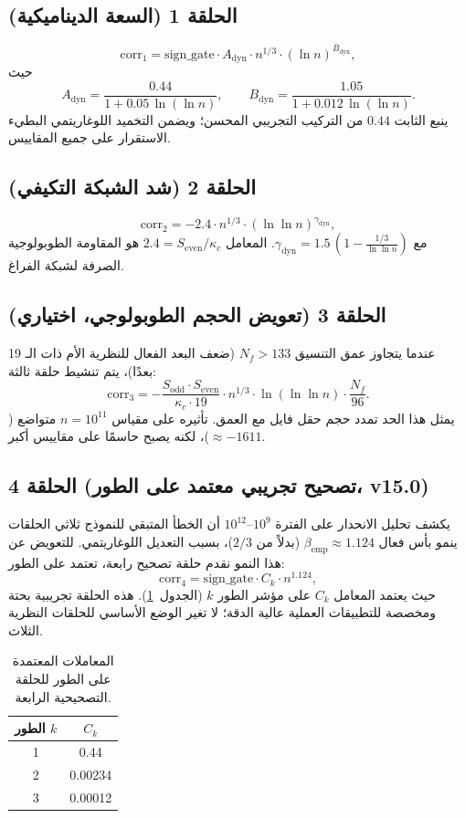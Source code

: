 \documentclass[11pt,a4paper]{article}
\newcommand{\kappac}{\kappa_c}
\newcommand{\Sodd}{S_{\mathrm{odd}}}
\newcommand{\Seven}{S_{\mathrm{even}}}
\begin{document}
	\subsection{الحلقة 1 (السعة الديناميكية)}
	\[
	\mathrm{corr}_1 = \mathrm{sign\_gate} \cdot A_{\mathrm{dyn}} \cdot n^{1/3} \cdot (\ln n)^{B_{\mathrm{dyn}}},
	\]
	حيث
	\[
	A_{\mathrm{dyn}} = \frac{0.44}{1 + 0.05\,\ln(\ln n)}, \qquad
	B_{\mathrm{dyn}} = \frac{1.05}{1 + 0.012\,\ln(\ln n)}.
	\]
	ينبع الثابت $0.44$ من التركيب التجريبي المحسن؛ ويضمن التخميد اللوغاريتمي البطيء الاستقرار على جميع المقاييس.
	
	\subsection{الحلقة 2 (شد الشبكة التكيفي)}
	\[
	\mathrm{corr}_2 = -2.4 \cdot n^{1/3} \cdot (\ln\ln n)^{\gamma_{\mathrm{dyn}}},
	\]
	مع $\gamma_{\mathrm{dyn}} = 1.5\,(1 - \frac{1/3}{\ln\ln n})$. المعامل $2.4 = \Seven/\kappac$ هو المقاومة الطوبولوجية الصرفة لشبكة الفراغ.
	
	\subsection{الحلقة 3 (تعويض الحجم الطوبولوجي، اختياري)}
	عندما يتجاوز عمق التنسيق $N_f > 133$ (ضعف البعد الفعال للنظرية الأم ذات الـ 19 بعدًا)، يتم تنشيط حلقة ثالثة:
	\[
	\mathrm{corr}_3 = -\frac{\Sodd\cdot\Seven}{\kappac\cdot 19} \cdot n^{1/3} \cdot \ln(\ln\ln n) \cdot \frac{N_f}{96}.
	\]
	يمثل هذا الحد تمدد حجم حقل فايل مع العمق. تأثيره على مقياس $n=10^{11}$ متواضع ($\approx -1611$)، لكنه يصبح حاسمًا على مقاييس أكبر.
	
	\subsection{الحلقة 4 (تصحيح تجريبي معتمد على الطور، v15.0)}
	يكشف تحليل الانحدار على الفترة $10^9$--$10^{12}$ أن الخطأ المتبقي للنموذج ثلاثي الحلقات ينمو بأس فعال $\beta_{\mathrm{emp}} \approx 1.124$ (بدلاً من $2/3$)، بسبب التعديل اللوغاريتمي. للتعويض عن هذا النمو نقدم حلقة تصحيح رابعة، تعتمد على الطور:
	\[
	\mathrm{corr}_4 = \mathrm{sign\_gate} \cdot C_k \cdot n^{1.124},
	\]
	حيث يعتمد المعامل $C_k$ على مؤشر الطور $k$ (الجدول~\ref{tab:phase-coeffs}). هذه الحلقة تجريبية بحتة ومخصصة للتطبيقات العملية عالية الدقة؛ لا تغير الوضع الأساسي للحلقات النظرية الثلاث.
	
	\begin{table}[htbp]
		\centering
		\caption{المعاملات المعتمدة على الطور للحلقة التصحيحية الرابعة.}
		\label{tab:phase-coeffs}
		\begin{tabular}{c c}
			\toprule
			الطور $k$ & $C_k$ \\
			\midrule
			1 & 0.44 \\
			2 & 0.00234 \\
			3 & 0.00012 \\
			\bottomrule
		\end{tabular}
	\end{table}
	
\end{document}
